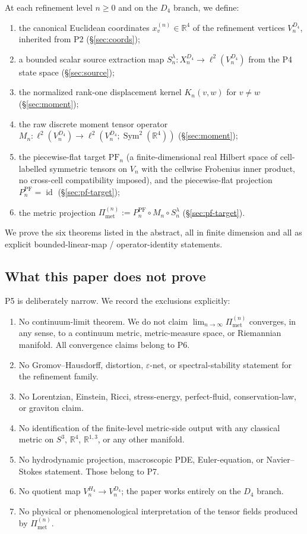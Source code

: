 \documentclass[11pt, a4paper]{amsart}
\theoremstyle{definition}
\newcommand{\R}{\mathbb{R}}
\newcommand{\id}{\operatorname{id}}
\newcommand{\Sym}{\operatorname{Sym}}
\newcommand{\Met}{\mathrm{met}}
\newcommand{\PF}{\mathrm{PF}}
\newcommand{\Pimet}{\Pi_{\Met}}
\begin{document}
At each refinement level $n \geq 0$ and on the $D_4$ branch, we
define:
\begin{enumerate}
\item the canonical Euclidean coordinates $x_v^{(n)} \in \R^4$ of
  the refinement vertices $V_n^{D_4}$, inherited from P2
  (\S\ref{sec:coords});
\item a bounded scalar source extraction map $S_n^\lambda \colon
  X_n^{D_4} \to \ell^2(V_n^{D_4})$ from the P4 state space
  (\S\ref{sec:source});
\item the normalized rank-one displacement kernel $K_n(v, w)$
  for $v \neq w$ (\S\ref{sec:moment});
\item the raw discrete moment tensor operator
  $M_n \colon \ell^2(V_n^{D_4}) \to \ell^2(V_n^{D_4}; \Sym^2(\R^4))$
  (\S\ref{sec:moment});
\item the piecewise-flat target $\PF_n$ (a finite-dimensional
  real Hilbert space of cell-labelled symmetric tensors on $V_n$
  with the cellwise Frobenius inner product, no cross-cell
  compatibility imposed), and the piecewise-flat projection
  $P_n^\PF = \id$ (\S\ref{sec:pf-target});
\item the metric projection $\Pimet^{(n)} := P_n^\PF \circ M_n
  \circ S_n^\lambda$ (\S\ref{sec:pf-target}).
\end{enumerate}
We prove the six theorems listed in the abstract, all in finite
dimension and all as explicit bounded-linear-map / operator-identity
statements.

\subsection{What this paper does not prove}

P5 is deliberately narrow. We record the exclusions explicitly:
\begin{enumerate}
\item No continuum-limit theorem. We do not claim
  $\lim_{n \to \infty} \Pimet^{(n)}$ converges, in any sense, to
  a continuum metric, metric-measure space, or Riemannian
  manifold. All convergence claims belong to P6.
\item No Gromov--Hausdorff, distortion, $\varepsilon$-net, or
  spectral-stability statement for the refinement family.
\item No Lorentzian, Einstein, Ricci, stress-energy, perfect-fluid,
  conservation-law, or graviton claim.
\item No identification of the finite-level metric-side output
  with any classical metric on $S^3$, $\R^4$, $\R^{1,3}$, or any
  other manifold.
\item No hydrodynamic projection, macroscopic PDE, Euler-equation,
  or Navier--Stokes statement. Those belong to P7.
\item No quotient map $V_n^{H_4} \to V_n^{D_4}$; the paper works
  entirely on the $D_4$ branch.
\item No physical or phenomenological interpretation of the
  tensor fields produced by $\Pimet^{(n)}$.
\end{enumerate}
\end{document}

